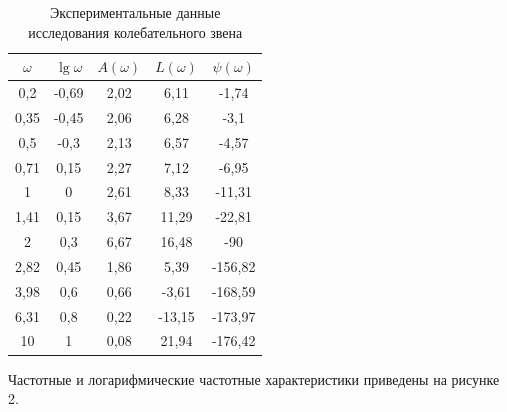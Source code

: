 \documentclass[a4paper, 11pt, russian]{article}
\begin{document}
    \begin{table}[ht!]
        \flushleft
        \caption{Экспериментальные данные исследования колебательного звена}
        \begin{tabular}{|c|c|c|c|c|}
        	\hline
            $\omega$ & $\lg{\omega}$ & $A(\omega)$ & $L(\omega)$ & $\psi(\omega)$\\
            \hline
            0,2 & -0,69 & 2,02 & 6,11 & -1,74\\
            \hline
            0,35 & -0,45 & 2,06 & 6,28 & -3,1\\
            \hline
            0,5 & -0,3 & 2,13 & 6,57 & -4,57\\
            \hline
            0,71 & 0,15 & 2,27 & 7,12 & -6,95\\
            \hline
            1 & 0 & 2,61 & 8,33 & -11,31\\
            \hline
            1,41 & 0,15 & 3,67 & 11,29 & -22,81\\
            \hline
            2 & 0,3 & 6,67 & 16,48 & -90\\ %
            \hline
            2,82 & 0,45 & 1,86 & 5,39 & -156,82\\
            \hline
            3,98 & 0,6 & 0,66 & -3,61 & -168,59\\
            \hline
            6,31 & 0,8 & 0,22 & -13,15 & -173,97\\
            \hline
            10 & 1 & 0,08 & 21,94 & -176,42\\
            \hline
        \end{tabular}
    \end{table}
    \newpage
    Частотные и логарифмические частотные характеристики приведены на рисунке 2.
\end{document}
